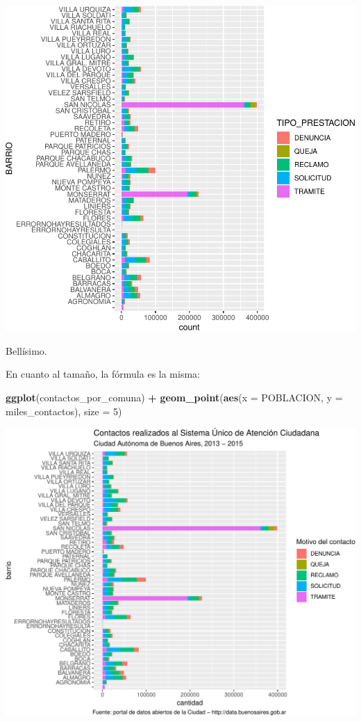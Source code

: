 \documentclass[]{book}
\newenvironment{Shaded}{\begin{snugshade}}{\end{snugshade}}
\newcommand{\KeywordTok}[1]{\textcolor[rgb]{0.13,0.29,0.53}{\textbf{#1}}}
\newcommand{\DataTypeTok}[1]{\textcolor[rgb]{0.13,0.29,0.53}{#1}}
\newcommand{\DecValTok}[1]{\textcolor[rgb]{0.00,0.00,0.81}{#1}}
\newcommand{\StringTok}[1]{\textcolor[rgb]{0.31,0.60,0.02}{#1}}
\newcommand{\OperatorTok}[1]{\textcolor[rgb]{0.81,0.36,0.00}{\textbf{#1}}}
\newcommand{\NormalTok}[1]{#1}
\begin{document}
\includegraphics{ciencia_de_datos_politicas_publicas_files/figure-latex/unnamed-chunk-86-1.pdf}

Bellísimo.

En cuanto al tamaño, la fórmula es la misma:

\begin{Shaded}
\begin{Highlighting}[]
\KeywordTok{ggplot}\NormalTok{(contactos_por_comuna) }\OperatorTok{+}\StringTok{ }
\StringTok{    }\KeywordTok{geom_point}\NormalTok{(}\KeywordTok{aes}\NormalTok{(}\DataTypeTok{x =}\NormalTok{ POBLACION, }\DataTypeTok{y =}\NormalTok{ miles_contactos), }\DataTypeTok{size =} \DecValTok{5}\NormalTok{)}
\end{Highlighting}
\end{Shaded}

\includegraphics{ciencia_de_datos_politicas_publicas_files/figure-latex/unnamed-chunk-87-1.pdf}
\end{document}
